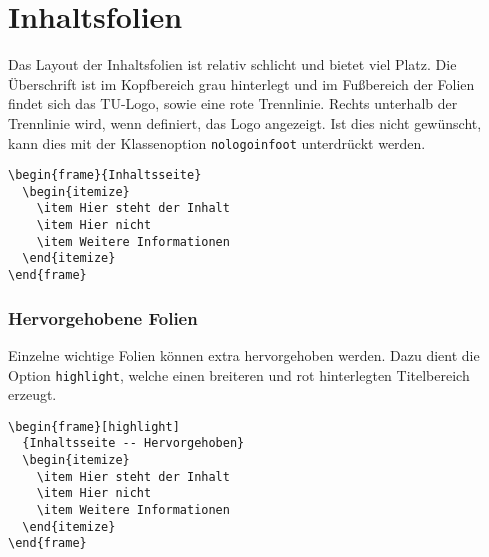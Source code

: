 \section{Inhaltsfolien}

Das Layout der Inhaltsfolien ist relativ schlicht und bietet viel Platz.
Die Überschrift ist im Kopfbereich grau hinterlegt und im Fußbereich der Folien
findet sich das TU-Logo, sowie eine rote Trennlinie.
Rechts unterhalb der Trennlinie wird, wenn definiert, das Logo angezeigt.
Ist dies nicht gewünscht, kann dies mit der Klassenoption
\lstinline{nologoinfoot} unterdrückt werden.

\begin{minipage}{0.5\textwidth}
\begin{verbatim}
\begin{frame}{Inhaltsseite}
  \begin{itemize}
    \item Hier steht der Inhalt
    \item Hier nicht
    \item Weitere Informationen
  \end{itemize}
\end{frame}
\end{verbatim}
\end{minipage}
\begin{minipage}{0.5\textwidth}
\end{minipage}

\subsubsection{Hervorgehobene Folien}

Einzelne wichtige Folien können extra hervorgehoben werden.
Dazu dient die Option \lstinline{highlight},
welche einen breiteren und rot hinterlegten Titelbereich erzeugt.

\begin{minipage}{0.5\textwidth}
\begin{verbatim}
\begin{frame}[highlight]
  {Inhaltsseite -- Hervorgehoben}
  \begin{itemize}
    \item Hier steht der Inhalt
    \item Hier nicht
    \item Weitere Informationen
  \end{itemize}
\end{frame}
\end{verbatim}
\end{minipage}
\begin{minipage}{0.5\textwidth}
\end{minipage}

